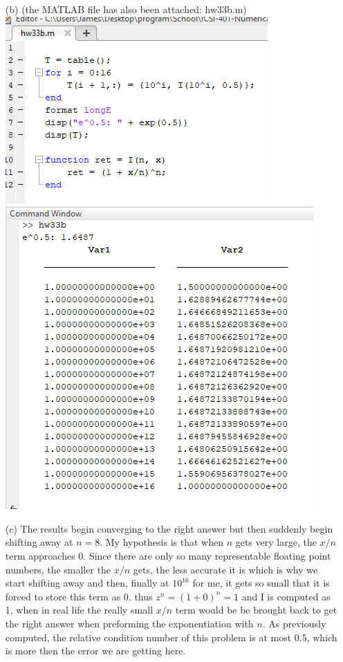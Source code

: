 \documentclass{article}
\begin{document}
\begin{itemize}
\begin{itemize}
        \newpage
        \item[(b)] (the MATLAB file has also been attached: hw33b.m)
        \newline
        \includegraphics[scale=0.4]{Homework3/3.3b.png}
        \newline
        \includegraphics[scale=0.4]{Homework3/res3.3b.png}
        \item[(c)] The results begin converging to the right answer but then suddenly begin shifting away at $n=8$. My hypothesis is that when $n$ gets very large, the $x/n$ term approaches 0. Since there are only so many representable floating point numbers, the smaller the $x/n$ gets, the less accurate it is which is why we start shifting away and then, finally at $10^16$ for me, it gets so small that it is forced to store this term as 0. thus $z^n = (1 + 0)^n = 1$ and I is computed as 1, when in real life the really small $x/n$ term would be be brought back to get the right answer when preforming the exponentiation with $n$. As previously computed, the relative condition number of this problem is at most 0.5, which is more then the error we are getting here.  
        

\end{itemize}
\end{itemize}
\end{document}
